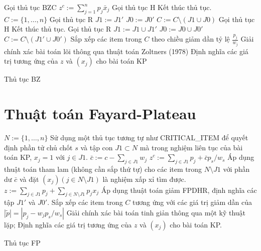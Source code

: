 \begin{algorithm}[H]
    \DontPrintSemicolon
    \vspace{1em}
    \vspace{1em}
    Gọi thủ tục BZC\;
    $z^c := \sum_{j=1}^np_j\bar{x}_j$\;
    Gọi thủ tục H\;
    {
        Kết thúc thủ tục.\;
    }
    $C := \{1, \dots, n\}$\;
    Gọi thủ tục R\;
    $J1 := J1'$\;
    $J0 := J0'$\;
    $C := C \setminus (J1 \cup J0)$
    {
        Gọi thủ tục H\;
        {
            Kết thúc thủ tục.\;
        }
        Gọi thủ tục R\;
        $J1 := J1 \cup J1'$\;
        $J0 := J0 \cup J0'$\;
        $C := C \setminus (J1' \cup J0')$
    }
    Sắp xếp các item trong $C$ theo chiều giảm dần tỷ lệ $\frac{p_j}{w_j}$\;
    Giải chính xác bài toán lõi thông qua thuật toán Zoltners (1978)\;
    Định nghĩa các giá trị tương ứng của $z$ và $(x_j)$ cho bài toán KP\;
    \caption{Thủ tục BZ}
    \label{algo:bz}
\end{algorithm}


\section{Thuật toán Fayard-Plateau}

\begin{algorithm}[H]
    \DontPrintSemicolon
    \vspace{1em}
    \vspace{1em}

    $N := \{1, \dots, n\}$\;
    Sử dụng một thủ tục tương tự như CRITICAL\_ITEM để quyết định phần tử chủ chốt $s$ và tập con $J1 \subset N$ mà trong nghiệm liên tục của bài toán KP, $x_j = 1$ với $j \in J1$.\;
    $\bar{c} := c - \sum_{j \in J1}w_j$\;
    $z^c := \sum_{j \in J1}p_j + \bar{c}p_s / w_s$\;
    Áp dụng thuật toán tham lam (không cần sắp thứ tự) cho các item trong $N \setminus J1$ với phần dư $\bar{c}$ và đặt $(x_j) (j \in N \setminus J1)$ là nghiệm xấp xỉ tìm được.\;
    $z := \sum_{j \in J1}p_j + \sum_{j \in N \setminus J1}p_jx_j$\;
    Áp dụng thuật toán giảm FPDHR, định nghĩa các tập $J1'$ và $J0'$.\;
    Sắp xếp các item trong $C$ tương ứng với các giá trị giảm dần của $|\widetilde{p}| = |p_j - w_jp_s / w_s|$\;
    Giải chính xác bài toán tinh giản thông qua một kỹ thuật lặp;\;
    Định nghĩa các giá trị tương ứng của $z$ và $(x_j)$ cho bài toán KP.
    \caption{Thủ tục FP}
    \label{algo:fp}
\end{algorithm}

